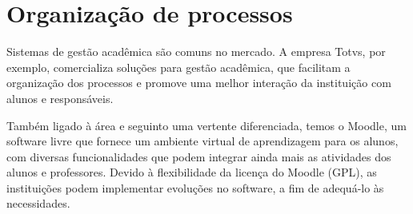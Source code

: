 \section{Organização de processos}\label{sec:process_organization}


Sistemas de gestão acadêmica são comuns no mercado. A empresa Totvs, por exemplo, comercializa soluções para gestão acadêmica, que facilitam a organização dos processos e promove uma melhor interação da instituição com alunos e responsáveis. 


Também ligado à área e seguinto uma vertente diferenciada, temos o Moodle, um software livre que fornece um ambiente virtual de aprendizagem para os alunos, com diversas funcionalidades que podem integrar ainda mais as atividades dos alunos e professores. Devido à flexibilidade da licença do Moodle (GPL), as instituições podem implementar evoluções no software, a fim de adequá-lo às necessidades.